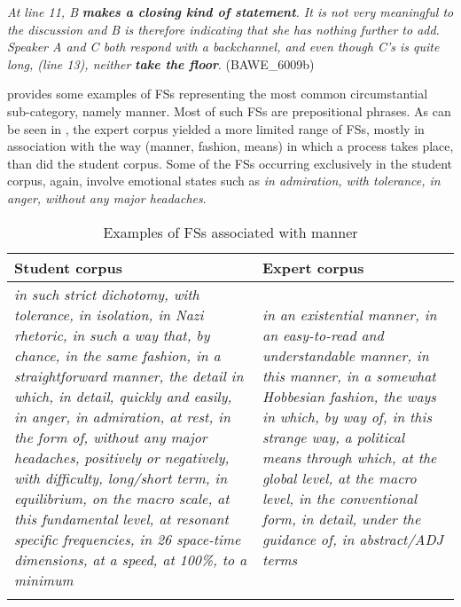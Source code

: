 \documentclass[output=paper]{langscibook}
\begin{document}
\ea \label{ex:wang:7}\textit{At line 11, B} \textbf{\textit{makes a closing kind of statement}}\textit{. It is not very meaningful to the discussion and B is therefore indicating that she has nothing further to add. Speaker A and C both respond with a backchannel, and even though C’s is quite long, (line 13), neither} \textbf{\textit{take the floor}}. (BAWE\_6009b)
\z

 provides some examples of FSs representing the most common circumstantial sub-category, namely manner. Most of such FSs are prepositional phrases. As can be seen in , the expert corpus yielded a more limited range of FSs, mostly in association with the way (manner, fashion, means) in which a process takes place, than did the student corpus. Some of the FSs occurring exclusively in the student corpus, again, involve emotional states such as \textit{in admiration, with tolerance, in anger, without any major headaches}. 


\begin{table}
\begin{tabularx}{\textwidth}{QQ}
\lsptoprule
Student corpus & Expert corpus\\\midrule
\textit{in such strict dichotomy, with tolerance, in isolation, in Nazi rhetoric, in such a way that, by chance, in the same fashion, in a straightforward manner, the detail in which, in detail, quickly and easily, in anger, in admiration, at rest, in the form of, without any major headaches, positively or negatively, with difficulty, long/short term, in equilibrium, on the macro scale, at this fundamental level, at resonant specific frequencies, in 26 space-time dimensions, at a speed, at 100\%, to a minimum} & \textit{in an existential manner, in an easy-to-read and understandable manner, in this manner, in a somewhat Hobbesian fashion, the ways in which, by way of, in this strange way, a political means through which, at the global level,  at the macro level, in the conventional form, in detail, under the guidance of, in abstract/ADJ terms}\\
\lspbottomrule
\end{tabularx}
\caption{Examples of FSs associated with manner\label{tab:wang:8}}
\end{table}
\end{document}
